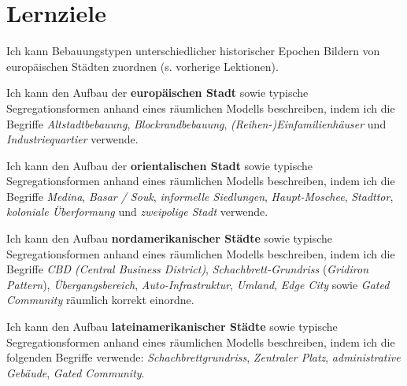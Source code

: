 \newpage
\section{Lernziele}
\begin{todolist}
\item Ich kann Bebauungstypen unterschiedlicher historischer Epochen Bildern von europäischen Städten zuordnen (s. vorherige Lektionen).
\item Ich kann den Aufbau der \textbf{europäischen Stadt} sowie typische Segregationsformen anhand eines räumlichen Modells beschreiben, indem ich die Begriffe \textit{Altstadtbebauung}, \textit{Blockrandbebauung}, \textit{(Reihen-)Einfamilienhäuser} und \textit{Industriequartier} verwende.
\item Ich kann den Aufbau der \textbf{orientalischen Stadt} sowie typische Segregationsformen anhand eines räumlichen Modells beschreiben, indem ich die Begriffe \textit{Medina}, \textit{Basar / Souk}, \textit{informelle Siedlungen}, \textit{Haupt-Moschee}, \textit{Stadttor}, \textit{koloniale Überformung} und \textit{zweipolige Stadt} verwende.
\item Ich kann den Aufbau \textbf{nordamerikanischer Städte} sowie typische Segregationsformen anhand eines räumlichen Modells beschreiben, indem ich die Begriffe \textit{CBD (Central Business District)}, \textit{Schachbrett-Grundriss} (\textit{Gridiron Pattern}), \textit{Übergangsbereich}, \textit{Auto-Infrastruktur}, \textit{Umland}, \textit{Edge City} sowie \textit{Gated Community} räumlich korrekt einordne.
\item Ich kann den Aufbau \textbf{lateinamerikanischer Städte} sowie typische Segregationsformen anhand eines räumlichen Modells beschreiben, indem ich die folgenden Begriffe verwende: \textit{Schachbrettgrundriss}, \textit{Zentraler Platz}, \textit{administrative Gebäude}, \textit{Gated Community}.
\end{todolist}

